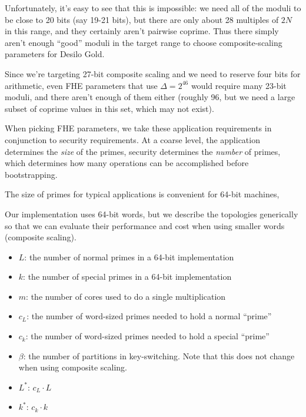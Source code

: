 \documentclass[../../fheimpl.tex]{subfiles}
\begin{document}
	Unfortunately, it's easy to see that this is impossible: we need all of the moduli to be close to 20 bits (say 19-21 bits), but there are only about 28 multiples of $2N$ in this range, and they certainly aren't pairwise coprime. Thus there simply aren't enough ``good'' moduli in the target range to choose composite-scaling parameters for Desilo Gold.
	
	Since we're targeting 27-bit composite scaling and we need to reserve four bits for arithmetic, even FHE parameters that use $\Delta=2^{46}$ would require many 23-bit moduli, and there aren't enough of them either (roughly 96, but we need a large subset of coprime values in this set, which may not exist).
	
	
	
	
	
	When picking FHE parameters, we take these application requirements in conjunction to security requirements. At a coarse level, the application determines the \emph{size} of the primes, security determines the \emph{number} of primes, which determines how many operations can be accomplished before bootstrapping.
	
	The size of primes for typical applications is convenient for 64-bit machines, 
	
	
	
	
	Our implementation uses 64-bit words, but we describe the topologies generically so that we can evaluate their performance and cost when using smaller words (composite scaling).
	
	\begin{itemize}
		\item $L$: the number of normal primes in a 64-bit implementation
		\item $k$: the number of special primes in a 64-bit implementation
		\item $m$: the number of cores used to do a single multiplication
		\item $c_L$: the number of \textsf{word}-sized primes needed to hold a normal ``prime''
		\item $c_k$: the number of \textsf{word}-sized primes needed to hold a special ``prime''
		\item $\beta$: the number of partitions in key-switching. Note that this does not change when using composite scaling.
		\item $L^*$: $c_L\cdot L$
		\item $k^*$: $c_k\cdot k$
	\end{itemize}
	
\end{document}

